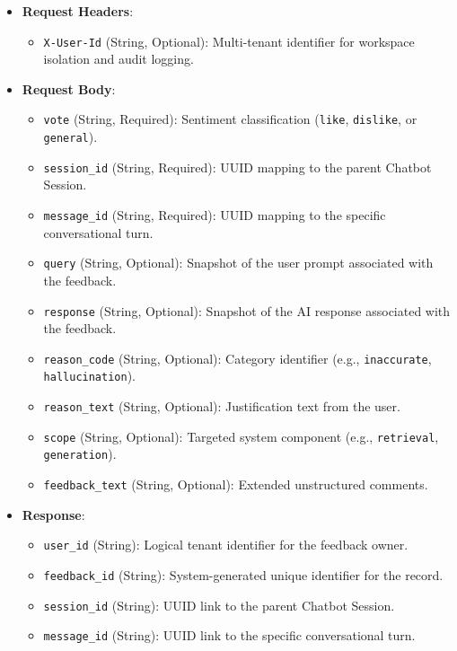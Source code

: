 \begin{itemize}
    \item \textbf{Request Headers}:
    \begin{itemize}
        \item \texttt{X-User-Id} (String, Optional): Multi-tenant identifier for workspace isolation and audit logging.
    \end{itemize}
    \item \textbf{Request Body}:
    \begin{itemize}
        \item \texttt{vote} (String, Required): Sentiment classification (\texttt{like}, \texttt{dislike}, or \texttt{general}).
        \item \texttt{session\_id} (String, Required): UUID mapping to the parent Chatbot Session.
        \item \texttt{message\_id} (String, Required): UUID mapping to the specific conversational turn.
        \item \texttt{query} (String, Optional): Snapshot of the user prompt associated with the feedback.
        \item \texttt{response} (String, Optional): Snapshot of the AI response associated with the feedback.
        \item \texttt{reason\_code} (String, Optional): Category identifier (e.g., \texttt{inaccurate}, \texttt{hallucination}).
        \item \texttt{reason\_text} (String, Optional): Justification text from the user.
        \item \texttt{scope} (String, Optional): Targeted system component (e.g., \texttt{retrieval}, \texttt{generation}).
        \item \texttt{feedback\_text} (String, Optional): Extended unstructured comments.
    \end{itemize}
    \item \textbf{Response}:
    \begin{itemize}
        \item \texttt{user\_id} (String): Logical tenant identifier for the feedback owner.
        \item \texttt{feedback\_id} (String): System-generated unique identifier for the record.
        \item \texttt{session\_id} (String): UUID link to the parent Chatbot Session.
        \item \texttt{message\_id} (String): UUID link to the specific conversational turn.

\end{itemize}
\end{itemize}
